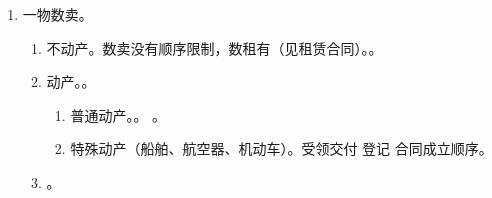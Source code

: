 \begin{enumerate}
\begin{enumerate}
                \begin{enumerate}
                  \item 价款给付方式。 \yjt 卖方取回权。
                  \item 两线三区。动产所有权保留 + 分期付款一起考。
                  \item 特殊行权。卖方 3 选 1。
                        \begin{enumerate}
                          \item 总未付 \% \yjt 加速到期权/权 \yjt 丧失分期权利 + 一次性付清 \yjt 催告 \xjt。
                          \item {}权（根本违约）。恢复原状 \yjt 给付型不当得利，双方互负返还义务。伤敌一千自损八百。
                          \item {}权。
                        \end{enumerate}
                \end{enumerate}
        \end{enumerate}
  \item 一物数卖。
        \begin{enumerate}
          \item 不动产。数卖没有顺序限制，数租有（见租赁合同）。。
          \item 动产。。
                \begin{enumerate}
                  \item 普通动产。。
                        。
                  \item 特殊动产（船舶、航空器、机动车）。受领交付 \dy 登记 \dy 合同成立顺序。
                \end{enumerate}
          \item {}。
        \end{enumerate}
\end{enumerate}
